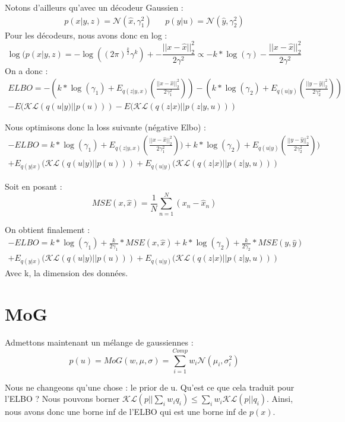 \documentclass{article}
\begin{document}
Notons d'ailleurs qu'avec un décodeur Gaussien :
\begin{align}
    p(x|y,z) = \mathcal{N}(\hat{x}, \gamma_1^2) && p(y|u) = \mathcal{N}(\hat{y}, \gamma_2^2)
\end{align}
Pour les décodeurs, nous avons donc en log :
\begin{equation}
    \log(p(x|y,z) = -\log((2\pi)^{\frac{k}{2}} \gamma^{k}) + -\frac{||x-\hat{x}||^2_2}{2\gamma^2} \propto - k * \log(\gamma) - \frac{||x-\hat{x}||^2_2}{2\gamma^2}
\end{equation}
On a donc :
\begin{multline}
    ELBO = - (k * \log(\gamma_1) + E_{q(z|y,x)}(\frac{||x-\hat{x}||^2_2}{2\gamma^2_1})) - (k * \log(\gamma_2) + E_{q(u|y)}(\frac{||y-\hat{y}||^2_2}{2\gamma^2_2})) \\ - E(\mathcal{KL}(q(u|y)||p(u)))  - E(\mathcal{KL}(q(z|x)||p(z|y,u)))
\end{multline}

Nous optimisons donc la loss suivante (négative Elbo) :
\begin{multline}
    -ELBO = k*\log(\gamma_1) + E_{q(z|y,x)}(\frac{||x-\hat{x}||^2_2}{2\gamma^2_1})) + k * \log(\gamma_2) + E_{q(u|y)}(\frac{||y-\hat{y}||^2_2}{2\gamma^2_2})) \\+ E_{q(y|x)}(\mathcal{KL}(q(u|y)||p(u))) + E_{q(u|y)}(\mathcal{KL}(q(z|x)||p(z|y,u)))
\end{multline}

Soit en posant :
\begin{equation}
    MSE(x,\hat{x}) = \frac{1}{N}\sum_{n=1}^N (x_n-\hat{x}_n)
\end{equation}

On obtient finalement :
\begin{multline}
    -ELBO = k*\log(\gamma_1)  + \frac{k}{2\gamma_1}*MSE(x,\hat{x}) + k*\log(\gamma_2) + \frac{k}{2\gamma_2}*MSE(y,\hat{y}) \\+ E_{q(y|x)}(\mathcal{KL}(q(u|y)||p(u))) + E_{q(u|y)}(\mathcal{KL}(q(z|x)||p(z|y,u)))
\end{multline}
Avec k, la dimension des données.

\section{MoG}

Admettons maintenant un mélange de gaussiennes :
\begin{equation}
    p(u) = MoG(w, \mu, \sigma) = \sum_{i=1}^{Comp} w_i \mathcal{N}(\mu_i,\sigma_i^2)
\end{equation}

Nous ne changeons qu'une chose : le prior de u.
Qu'est ce que cela traduit pour l'ELBO ? 
Nous pouvons borner $\mathcal{KL}(p||\sum_i w_i q_i) \leq \sum_i w_i \mathcal{KL}(p||q_i)$. Ainsi, nous avons donc une borne inf de l'ELBO qui est une borne inf de $p(x)$.
\end{document}
